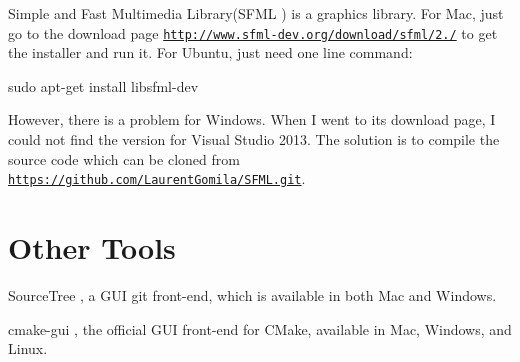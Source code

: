 Simple and Fast Multimedia Library(S\+F\+M\+L \cite{sfml}) is a graphics library. For Mac, just go to the download page \href{http://www.sfml-dev.org/download/sfml/2.1/}{\tt http\+://www.\+sfml-\/dev.\+org/download/sfml/2./} to get the installer and run it. For Ubuntu, just need one line command\+: 
\begin{DoxyCode}
sudo apt-\textcolor{keyword}{get} install libsfml-dev
\end{DoxyCode}
 However, there is a problem for Windows. When I went to its download page, I could not find the version for Visual Studio 2013. The solution is to compile the source code which can be cloned from \href{https://github.com/LaurentGomila/SFML.git}{\tt https\+://github.\+com/\+Laurent\+Gomila/\+S\+F\+M\+L.\+git}.\hypertarget{_setup_development_environment_SetupDevelopmentEnvironmentOtherTools}{}\section{Other Tools}\label{_setup_development_environment_SetupDevelopmentEnvironmentOtherTools}

\begin{DoxyItemize}
\item Source\+Tree \cite{sourcetree}, a G\+U\+I git front-\/end, which is available in both Mac and Windows.
\item cmake-\/gui \cite{cmakegui}, the official G\+U\+I front-\/end for C\+Make, available in Mac, Windows, and Linux. 
\end{DoxyItemize}